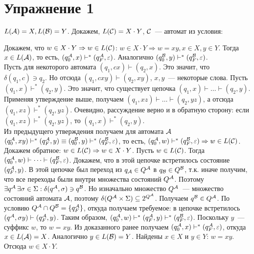 \documentclass[a4paper]{article}
\def\A{{\cal A}}
\def\B{{\cal B}}
\def\C{{\cal C}}
\begin{document}
\section*{Упражнение 1}
$L(\A)=X,L(\B)=Y$. Докажем, $L(\C)=X\cdot Y$, $\C$~--- автомат из условия:
\begin{center}
\end{center}
Докажем, что $w\in X\cdot Y\Rightarrow w\in L(\C)$:\newline
$w\in X\cdot Y\Rightarrow w=xy, x\in X, y\in Y$. Тогда $x\in L(\A)$, то есть, $(q_0^\A,x)\vdash^*(q_F^\A,\varepsilon)$. Аналогично $(q_0^\B,y)\vdash^*(q_F^\B,\varepsilon)$.
\\[5pt]
Пусть для некоторого автомата $(q_1,cx)\vdash(q_2,x)$. Это значит, что $\delta(q_1,c)\ni q_2$. Но отсюда $(q_1,cxy)\vdash(q_2,xy)$, $x,y$~--- некоторые слова. Пусть $(q_1,x)\vdash^*(q_2,y)$. Это значит, что существует цепочка $(q_1,x)\vdash\dots\vdash(q_2,y)$. Применяя утверждение выше, получаем $(q_1,xz)\vdash\dots\vdash(q_2,yz)$, а отсюда $(q_1,xz)\vdash^*(q_2,yz)$. Очевидно, рассуждение верно и в обратную сторону: если $(q_1,xz)\vdash^*(q_2,yz)$, то $(q_1,x)\vdash^*(q_2,y)$.
\\[5pt]
Из предыдущего утверждения получаем для автомата $\A$ $(q_0^\A,xy)\vdash^*(q_F^\A,y)\equiv(q_0^\B,y)\vdash^*(q^\B_F,\varepsilon)$, то есть, $(q_0^\A,w)\vdash^*(q_F^\B,\varepsilon)\Rightarrow w\in L(\C)$.\newline
Докажем обратное: $w\in L(\C)\Rightarrow w\in X\cdot Y$.\newline
Пусть $w\in L(\C)$. Тогда $(q_0^\A,w)\vdash\dots\vdash(q_F^\B,\varepsilon)$. Докажем, что в этой цепочке встретилось состояние $(q_F^\A,y)$.\newline
В этой цепочке был переход из $q_\A\in Q^\A$ в $q_\B\in Q^\B$, т.к. иначе получим, что все переходы были внутри множества состояний $Q^\A$. Поэтому $\exists q^\A\,\exists\sigma\in\Sigma:\delta(q^\A,\sigma)\ni q^\B$. Но изначально множество $Q^\A$~--- множество состояний автомата $\A$, поэтому $\delta(Q^\A\times\Sigma)\subseteq 2^{Q^\A}$. Получаем $q^\B\in Q^\A$. По условию $Q^\A\cap Q^\B=\{q_F^\A\}$, откуда получаем требуемое: в цепочке встретилось $(q^\A,\sigma y)\vdash(q_F^\A,y)$.\newline
Таким образом, $(q_0^\A,w)\vdash^*(q_F^\A,y)\vdash^*(q_F^\B,\varepsilon)$. Поскольку $y$~--- суффикс $w$, то $w=xy$. Из доказанного ранее получаем $(q_0^\A,x)\vdash^*(q_F^\A,\varepsilon)$, откуда $x\in L(\A)=X$. Аналогично $y\in L(\B)=Y$. Найдены $x\in X$ и $y\in Y$: $w=xy$. Отсюда $w\in X\cdot Y$.
\end{document}
